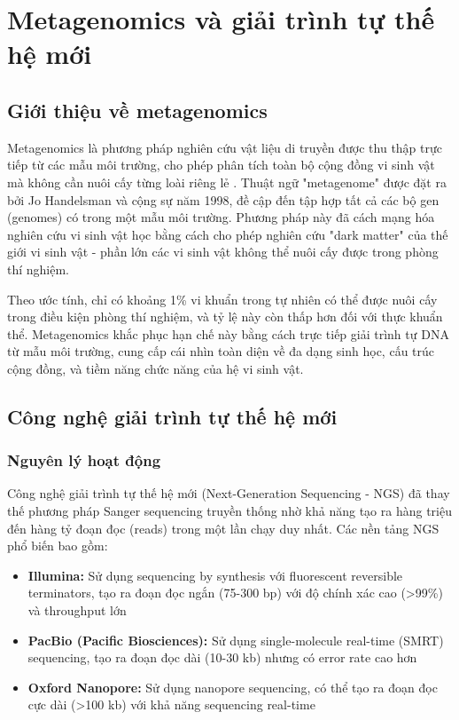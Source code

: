 \section{Metagenomics và giải trình tự thế hệ mới}
\label{sec:metagenomics}

\subsection{Giới thiệu về metagenomics}

Metagenomics là phương pháp nghiên cứu vật liệu di truyền được thu thập trực tiếp từ các mẫu môi trường, cho phép phân tích toàn bộ cộng đồng vi sinh vật mà không cần nuôi cấy từng loài riêng lẻ \cite{mokili2012metagenomics}. Thuật ngữ "metagenome" được đặt ra bởi Jo Handelsman và cộng sự năm 1998, đề cập đến tập hợp tất cả các bộ gen (genomes) có trong một mẫu môi trường. Phương pháp này đã cách mạng hóa nghiên cứu vi sinh vật học bằng cách cho phép nghiên cứu "dark matter" của thế giới vi sinh vật - phần lớn các vi sinh vật không thể nuôi cấy được trong phòng thí nghiệm.

Theo ước tính, chỉ có khoảng 1\% vi khuẩn trong tự nhiên có thể được nuôi cấy trong điều kiện phòng thí nghiệm, và tỷ lệ này còn thấp hơn đối với thực khuẩn thể. Metagenomics khắc phục hạn chế này bằng cách trực tiếp giải trình tự DNA từ mẫu môi trường, cung cấp cái nhìn toàn diện về đa dạng sinh học, cấu trúc cộng đồng, và tiềm năng chức năng của hệ vi sinh vật.

\subsection{Công nghệ giải trình tự thế hệ mới}

\subsubsection{Nguyên lý hoạt động}

Công nghệ giải trình tự thế hệ mới (Next-Generation Sequencing - NGS) đã thay thế phương pháp Sanger sequencing truyền thống nhờ khả năng tạo ra hàng triệu đến hàng tỷ đoạn đọc (reads) trong một lần chạy duy nhất. Các nền tảng NGS phổ biến bao gồm:

\begin{itemize}
    \item \textbf{Illumina:} Sử dụng sequencing by synthesis với fluorescent reversible terminators, tạo ra đoạn đọc ngắn (75-300 bp) với độ chính xác cao (>99\%) và throughput lớn

    \item \textbf{PacBio (Pacific Biosciences):} Sử dụng single-molecule real-time (SMRT) sequencing, tạo ra đoạn đọc dài (10-30 kb) nhưng có error rate cao hơn

    \item \textbf{Oxford Nanopore:} Sử dụng nanopore sequencing, có thể tạo ra đoạn đọc cực dài (>100 kb) với khả năng sequencing real-time
\end{itemize}

